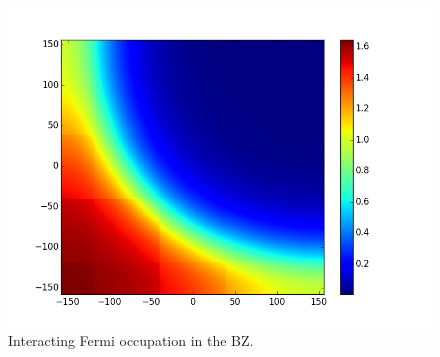   \begin{figure}
 \includegraphics[scale=0.5]{images/Fermi_occupation_se.png}
 \caption{Interacting Fermi occupation in the BZ. }
 \end{figure}